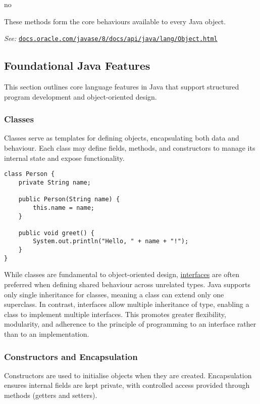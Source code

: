 no\documentclass{article}
\begin{document}
These methods form the core behaviours available to every Java object.

\smallskip
\textit{See:} \href{https://docs.oracle.com/javase/8/docs/api/java/lang/Object.html}{\texttt{docs.oracle.com/javase/8/docs/api/java/lang/Object.html}}

\subsection{Foundational Java Features}

This section outlines core language features in Java that support structured program development and object-oriented design.

\subsubsection{Classes}

Classes serve as templates for defining objects, encapsulating both data and behaviour. Each class may define fields, methods, and constructors to manage its internal state and expose functionality.

\begin{verbatim}
class Person {
    private String name;

    public Person(String name) {
        this.name = name;
    }

    public void greet() {
        System.out.println("Hello, " + name + "!");
    }
}
\end{verbatim}

While classes are fundamental to object-oriented design, \hyperref[subsec:interfaces]{interfaces} are often preferred when defining shared behaviour across unrelated types. Java supports only single inheritance for classes, meaning a class can extend only one superclass. In contrast, interfaces allow multiple inheritance of type, enabling a class to implement multiple interfaces. This promotes greater flexibility, modularity, and adherence to the principle of programming to an interface rather than to an implementation.



\subsubsection{Constructors and Encapsulation}

Constructors are used to initialise objects when they are created. Encapsulation ensures internal fields are kept private, with controlled access provided through methods (getters and setters).
\end{document}
